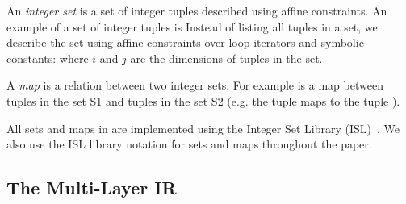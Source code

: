 An \emph{integer set} is a set of integer tuples described using affine constraints.  An example of a set of integer tuples is 
Instead of listing all tuples in a set, we describe the set using affine constraints over loop iterators and symbolic constants:  where $i$ and $j$ are the dimensions of tuples in the set.

A \emph{map} is a relation between two integer sets.  For example
is a map between tuples in the set S1 and tuples in the set S2 (e.g. the tuple  maps to the tuple ).

All sets and maps in \framework are implemented using the Integer Set Library (ISL)~\cite{verdoolaege_isl:_2010}. We also use the ISL library notation for sets and maps throughout the paper.


\subsection{The Multi-Layer IR}

